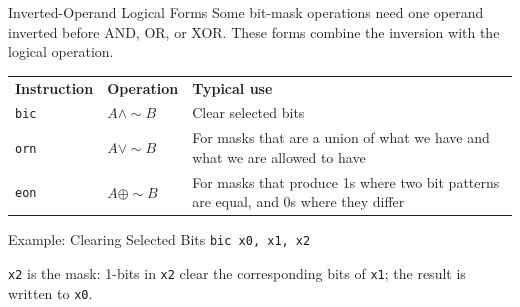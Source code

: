 \documentclass[aspectratio=169,11pt,t]{beamer}
\newcommand{\code}[1]{\texttt{#1}}
\begin{document}
\begin{frame}{Inverted-Operand Logical Forms}
Some bit-mask operations need one operand inverted before AND, OR, or XOR. These forms combine the inversion with the logical operation.
\vspace{0.12cm}
\begin{center}
\small
\renewcommand{\arraystretch}{1.14}
\begin{tabular}{>{\raggedright\arraybackslash}m{1.4cm}>{\raggedright\arraybackslash}m{2.2cm}>{\raggedright\arraybackslash}m{7.4cm}}
\rowcolor{navy}
{\color{white}\bfseries Instruction} & {\color{white}\bfseries Operation} & {\color{white}\bfseries Typical use} \\
\rowcolor{softgray}
\code{bic} & $A \land \sim B$ & Clear selected bits \\
\rowcolor{white}
\code{orn} & $A \lor \sim B$ & For masks 
that are a union of what we have and what we are allowed to have \\
\rowcolor{softgray}
\code{eon} & $A \oplus \sim B$ & For masks 
that produce 1s where two bit patterns are equal, and 0s where they differ\\
\end{tabular}
\end{center}
\vspace{0.12cm}
\begin{block}{Example: Clearing Selected Bits}
\large
\hspace{0.6cm}\code{bic x0, x1, x2}
\normalsize
\par
\vspace{0.08cm}
\small
\code{x2} is the mask: 1-bits in \code{x2} clear the corresponding bits of \code{x1}; the result is written to \code{x0}.
\normalsize
\end{block}
\end{frame}



\end{document}
